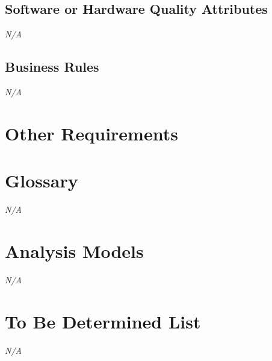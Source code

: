 \documentclass[english]{article}
\numberwithin{equation}{section} %
\begin{document}
\subsection{Software or Hardware Quality Attributes}
\textit{N/A}
\subsection{Business Rules}
\textit{N/A}

\section{Other Requirements}
\appendix
\section{Glossary}
\textit{N/A}
\section{Analysis Models}
\textit{N/A}
\section{To Be Determined List}
\textit{N/A}
\end{document}
